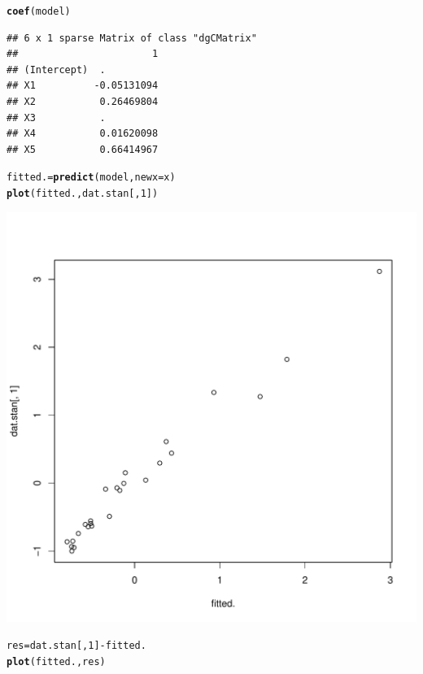 \documentclass{article}\usepackage[]{graphicx}\usepackage[]{color}
\makeatletter
\def\maxwidth{ %
  \ifdim\Gin@nat@width>\linewidth
    \linewidth
  \else
    \Gin@nat@width
  \fi
}
\newcommand{\hlnum}[1]{\textcolor[rgb]{0.686,0.059,0.569}{#1}}%
\newcommand{\hlopt}[1]{\textcolor[rgb]{0,0,0}{#1}}%
\newcommand{\hlstd}[1]{\textcolor[rgb]{0.345,0.345,0.345}{#1}}%
\newcommand{\hlkwb}[1]{\textcolor[rgb]{0.69,0.353,0.396}{#1}}%
\newcommand{\hlkwc}[1]{\textcolor[rgb]{0.333,0.667,0.333}{#1}}%
\newcommand{\hlkwd}[1]{\textcolor[rgb]{0.737,0.353,0.396}{\textbf{#1}}}%
\newenvironment{kframe}{%
 \def\at@end@of@kframe{}%
 \ifinner\ifhmode%
  \def\at@end@of@kframe{\end{minipage}}%
  \begin{minipage}{\columnwidth}%
 \fi\fi%
 \def\FrameCommand##1{\hskip\@totalleftmargin \hskip-\fboxsep
 \colorbox{shadecolor}{##1}\hskip-\fboxsep
     \hskip-\linewidth \hskip-\@totalleftmargin \hskip\columnwidth}%
 \MakeFramed {\advance\hsize-\width
   \@totalleftmargin\z@ \linewidth\hsize
   \@setminipage}}%
 {\par\unskip\endMakeFramed%
 \at@end@of@kframe}
\newenvironment{knitrout}{}{} %
\makeatother
\begin{document}
\begin{enumerate}[(a)]
\begin{knitrout}
\color{fgcolor}\begin{kframe}
\begin{alltt}
  \hlkwd{coef}\hlstd{(model)}
\end{alltt}
\begin{verbatim}
## 6 x 1 sparse Matrix of class "dgCMatrix"
##                       1
## (Intercept)  .         
## X1          -0.05131094
## X2           0.26469804
## X3           .         
## X4           0.01620098
## X5           0.66414967
\end{verbatim}
\begin{alltt}
  \hlstd{fitted.} \hlkwb{=} \hlkwd{predict}\hlstd{(model,} \hlkwc{newx} \hlstd{= x)}
  \hlkwd{plot}\hlstd{(fitted., dat.stan[,}\hlnum{1}\hlstd{])}
\end{alltt}
\end{kframe}
\includegraphics[width=\maxwidth]{figure/unnamed-chunk-9-1} 
\begin{kframe}\begin{alltt}
  \hlstd{res} \hlkwb{=} \hlstd{dat.stan[,}\hlnum{1}\hlstd{]} \hlopt{-} \hlstd{fitted.}
  \hlkwd{plot}\hlstd{(fitted., res)}
\end{alltt}
\end{kframe}

\end{knitrout}
\end{enumerate}
\end{document}
